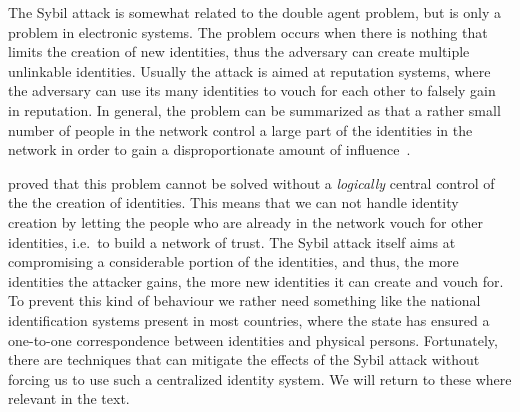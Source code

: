 The Sybil attack is somewhat related to the double agent problem, but is only 
a problem in electronic systems.
The problem occurs when there is nothing that limits the creation of new 
identities, thus the adversary can create multiple unlinkable identities.
Usually the attack is aimed at reputation systems, where the adversary can use 
its many identities to vouch for each other to falsely gain in reputation.
In general, the problem can be summarized as that a rather small number of 
people in the network control a large part of the identities in the network in 
order to gain a disproportionate amount of influence~\cite{SybilAttack}.

 proved that this problem cannot be solved without 
a \emph{logically} central control of the the creation of identities.
This means that we can not handle identity creation by letting the people who 
are already in the network vouch for other identities, i.e.\ to build a network 
of trust.
The Sybil attack itself aims at compromising a considerable portion of the 
identities, and thus, the more identities the attacker gains, the more new 
identities it can create and vouch for.
To prevent this kind of behaviour we rather need something like the national 
identification systems present in most countries, where the state has ensured 
a one-to-one correspondence between identities and physical persons.
Fortunately, there are techniques that can mitigate the effects of the Sybil 
attack without forcing us to use such a centralized identity system.
We will return to these where relevant in the text.




